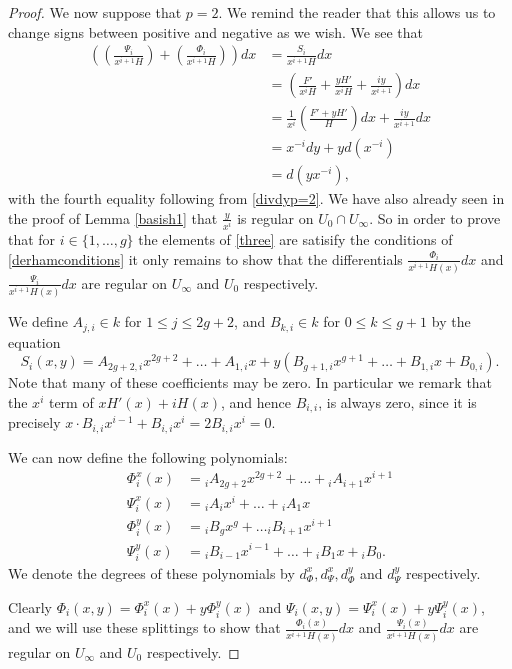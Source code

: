 \documentclass[draft, 11pt]{article} %
\theoremstyle{plain}
\theoremstyle{remark}
\begin{document}
\begin{proof}
We now suppose that $p=2$.
We remind the reader that this allows us to change signs between positive and negative as we wish.
We see that
\begin{align*}
\left( \left( \frac{ \Psi_i}{x^{i+1}H} \right) + \left( \frac{\Phi_i}{x^{i+1}H} \right) \right) dx & =  \frac{S_i}{x^{i+1}H}dx \\
& =  \left( \frac{F'}{x^iH} + \frac{yH'}{x^iH} + \frac{iy}{x^{i+1}} \right) dx \\
& =  \frac{1}{x^i}\left( \frac{F' + yH'}{H} \right) dx + \frac{iy}{x^{i+1}}dx \\
& =  x^{-i}dy + yd \left( x^{-i}\right) \\
& =  d\left( yx^{-i}\right),
\end{align*}
with the fourth equality following from \eqref{divdyp=2}.
We have also already seen in the proof of Lemma \ref{basish1} that $\frac{y}{x^i}$ is regular on $U_0 \cap U_\infty$.
So in order to prove that for $i\in \{1, \ldots, g\}$ the elements of \eqref{three} are satisify the conditions of \eqref{derhamconditions} it only remains to show that the differentials $\frac{\Phi_i}{x^{i+1}H(x)}dx$ and $\frac{\Psi_i}{x^{i+1}H(x)}dx$ are regular on $U_\infty$ and $U_0$ respectively.


We define $A_{j,i} \in k$ for $1 \leq j \leq 2g+2$, and $B_{k,i} \in k$ for $0\leq k \leq g+1$ by the equation
\[
S_i(x,y) = A_{2g+2,i}x^{2g+2} + \ldots + A_{1,i} x + y(B_{g+1,i} x^{g+1} + \ldots + B_{1,i} x + B_{0,i}).
\]
Note that many of these coefficients may be zero.
In particular we remark that the $x^i$ term of $xH'(x) + iH(x)$, and hence $B_{i,i}$, is always zero, since it is precisely $x \cdot B_{i,i}x^{i-1} + B_{i,i} x^i = 2B_{i,i}x^i = 0$.


We can now define the following polynomials:
\begin{equation}\label{Split}
\begin{split}
\Phi_i^x(x) & =  {}_iA_{2g+2}x^{2g+2} + \ldots + {}_iA_{i+1}x^{i+1} \\
\Psi_i^x(x) & =  {}_iA_ix^i + \ldots + {}_iA_1x \\
\Phi_i^y(x) & =  {}_iB_gx^g + \ldots {}_iB_{i+1}x^{i+1} \\
\Psi_i^y(x) & =  {}_iB_{i-1}x^{i-1} + \ldots + {}_iB_1x + {}_iB_0.
\end{split}
\end{equation}
We denote the degrees of these polynomials by $d_{\Phi}^x, d_{\Psi}^x, d_{\Phi}^y$ and $d_{\Psi}^y$ respectively.

Clearly $\Phi_i(x,y) = \Phi_i^x(x) + y\Phi_i^y(x)$ and $\Psi_i (x,y)= \Psi_i^x(x) + y\Psi_i^y(x)$, and we will use these splittings to show that $\frac{ \Phi_i(x) }{x^{i+1}H(x)}dx$ and $\frac{\Psi_i(x) }{x^{i+1}H(x)}dx$ are regular on $U_\infty$ and $U_0$ respectively.


\end{proof}
\end{document}
